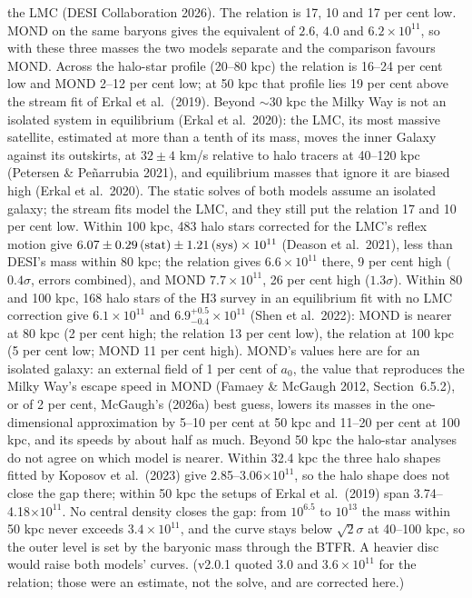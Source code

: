 \documentclass[
  10pt,
]{article}
\begin{document}
the LMC (DESI Collaboration 2026). The relation is 17, 10 and 17 per cent low. MOND on the same baryons gives the equivalent of $2.6$, $4.0$ and $6.2\times10^{11}$, so with these three masses the two models separate and the comparison favours MOND. Across the halo-star profile (20--80 kpc) the relation is 16--24 per cent low and MOND 2--12 per cent low; at 50 kpc that profile lies 19 per cent above the stream fit of Erkal et al.~(2019). Beyond $\sim$30 kpc the Milky Way is not an isolated system in equilibrium (Erkal et al.~2020): the LMC, its most massive satellite, estimated at more than a tenth of its mass, moves the inner Galaxy against its outskirts, at $32\pm4$ km/s relative to halo tracers at 40--120 kpc (Petersen \& Pe\~narrubia 2021), and equilibrium masses that ignore it are biased high (Erkal et al.~2020). The static solves of both models assume an isolated galaxy; the stream fits model the LMC, and they still put the relation 17 and 10 per cent low. Within 100 kpc, 483 halo stars corrected for the LMC's reflex motion give $6.07\pm0.29\,({\rm stat})\pm1.21\,({\rm sys})\times10^{11}$ (Deason et al.~2021), less than DESI's mass within 80 kpc; the relation gives $6.6\times10^{11}$ there, 9 per cent high ($0.4\sigma$, errors combined), and MOND $7.7\times10^{11}$, 26 per cent high ($1.3\sigma$). Within 80 and 100 kpc, 168 halo stars of the H3 survey in an equilibrium fit with no LMC correction give $6.1\times10^{11}$ and $6.9^{+0.5}_{-0.4}\times10^{11}$ (Shen et al.~2022): MOND is nearer at 80 kpc (2 per cent high; the relation 13 per cent low), the relation at 100 kpc (5 per cent low; MOND 11 per cent high). MOND's values here are for an isolated galaxy: an external field of 1 per cent of $a_0$, the value that reproduces the Milky Way's escape speed in MOND (Famaey \& McGaugh 2012, Section~6.5.2), or of 2 per cent, McGaugh's (2026a) best guess, lowers its masses in the one-dimensional approximation by 5--10 per cent at 50 kpc and 11--20 per cent at 100 kpc, and its speeds by about half as much. Beyond 50 kpc the halo-star analyses do not agree on which model is nearer. Within 32.4 kpc the three halo shapes fitted by Koposov et al.~(2023) give 2.85--3.06$\times10^{11}$, so the halo shape does not close the gap there; within 50 kpc the setups of Erkal et al.~(2019) span 3.74--4.18$\times10^{11}$. No central density closes the gap: from $10^{6.5}$ to $10^{13}$ the mass within 50 kpc never exceeds $3.4\times10^{11}$, and the curve stays below $\sqrt{2}\sigma$ at 40--100 kpc, so the outer level is set by the baryonic mass through the BTFR. A heavier disc would raise both models' curves. (v2.0.1 quoted $3.0$ and $3.6\times10^{11}$ for the relation; those were an estimate, not the solve, and are corrected here.)
\end{document}
